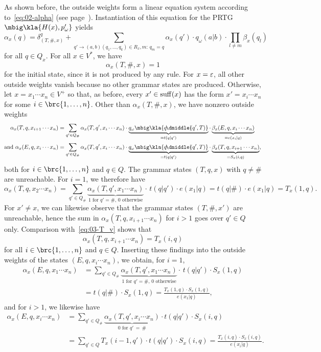 As shown before, the outside weights form a linear equation system according
to~\eqref{eq:02-alpha} (see page~\pageref{eq:02-alpha}). Instantiation of this
equation for the PRTG $\mbig\kla{H(x),p_\omega'}$ yields
\[
 \alpha_x(q) = \delta_{(T,\#,x)}^q + \sum_{q'\to(a,b)(q_1,\ldots,q_k)\in R_x, m:\,q_m=q} \alpha_x(q') \cdot q_\omega(a|b) \cdot \prod_{l\neq m} \beta_x(q_l)
\]
for all $q\in Q_x$. For all $x\in V^*$, we have
\label{eq:03-alpha-eps}\[
 \alpha_x(T,\#,x) = 1
\]
for the initial state, since it is not produced by any rule. For $x=\varepsilon$, all
other outside weights vanish because no other grammar states are produced.
Otherwise, let $x=x_1\cdots x_n\in V^+$ so that, as before, every
$x'\in\operatorname{suff}(x)$ has the form $x'=x_i\cdots x_n$ for some
$i\in\brc{1,\ldots,n}$. Other than $\alpha_x(T,\#,x)$, we have nonzero
outside weights
\begin{align*}
 \alpha_x(T,q,x_{i+1}\cdots x_n) &= \sum_{q'\in Q_\#} \alpha_x(T,q',x_i\cdots x_n) \cdot \underbrace{q_\omega\mbig\kla{q\npipe(q',T)}}_{=t(q|q')} \cdot \underbrace{\beta_x(E,q,x_i\cdots x_n)}_{=e(x_i|q)} \\
 \text{and }
 \alpha_x(E,q,x_i\cdots x_n)     &= \sum_{q'\in Q_\#} \alpha_x(T,q',x_i\cdots x_n) \cdot \underbrace{q_\omega\mbig\kla{q\npipe(q',T)}}_{=t(q|q')} \cdot \underbrace{\beta_x(T,q,x_{i+1}\cdots x_n)}_{=S_x(i,q)},
\end{align*}
both for $i\in\brc{1,\ldots,n}$ and $q\in Q$. The grammar states $(T,q,x)$ with $q\neq\#$ are unreachable. For $i=1$, we therefore have
\[
 \alpha_x(T,q,x_2\cdots x_n) = \sum_{q'\in Q_\#} \underbrace{\alpha_x(T,q',x_1\cdots x_n)}_{\text{$1$ for $q'=\#$, $0$ otherwise}} \cdot\, t(q|q') \cdot e(x_1|q)
 = t(q|\#) \cdot e(x_1|q) = T_x(1,q).
\]
For $x'\neq x$, we can likewise observe that the grammar states $(T,\#,x')$ are
unreachable, hence the sum in $\alpha_x(T,q,x_{i+1}\cdots x_n)$ for $i>1$ goes
over $q'\in Q$ only. Comparison with~\eqref{eq:03-T_v} shows that
\[
 \alpha_x(T,q,x_{i+1}\cdots x_n) = T_x(i,q)
\]
for all $i\in\brc{1,\ldots,n}$ and $q\in Q$. Inserting these findings into the
outside weights of the states $(E,q,x_i\cdots x_n)$, we obtain, for $i=1$,
\begin{align*}
 \alpha_x(E,q,x_1\cdots x_n)
 &= \sum_{q'\in Q_\#} \underbrace{\alpha_x(T,q',x_1\cdots x_n)}_{\text{$1$ for $q'=\#$, $0$ otherwise}} \cdot\, t(q|q') \cdot S_x(1,q) \\
 &= t(q|\#) \cdot S_x(1,q)
 = \frac{T_x(1,q) \cdot S_x(1,q)}{e(x_1|q)},
\end{align*}
and for $i>1$, we likewise have
\begin{align*}
 \alpha_x(E,q,x_i\cdots x_n)
 &= \sum_{q'\in Q_\#} \underbrace{\alpha_x(T,q',x_i\cdots x_n)}_{0\text{ for }q'\,=\,\#} \cdot t(q|q') \cdot S_x(i,q) \\
 &= \sum_{q'\in Q} T_x(i-1,q') \cdot t(q|q') \cdot S_x(i,q)
 = \frac{T_x(i,q) \cdot S_x(i,q)}{e(x_i|q)}.
\end{align*}

